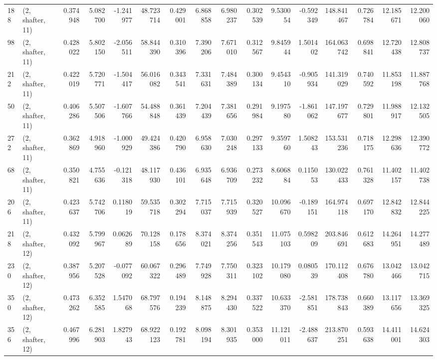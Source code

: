 \begin{tabular}{llrrrrrrrrrrrrrr}
188 &  (2, shafter, 11) &   0.374948 &   5.082700 &  -1.241977 &    48.723714 &   0.429001 &   6.868858 &   6.980237 &  0.302539 &   9.530054 &  -0.592349 &   148.841467 &  0.726784 &  12.185671 &  12.200060 \\
98  &  (2, shafter, 11) &   0.428022 &   5.802150 &  -2.056511 &    58.844390 &   0.310396 &   7.390206 &   7.671010 &  0.312567 &   9.845944 &   1.501402 &   164.063742 &  0.698841 &  12.720438 &  12.808737 \\
212 &  (2, shafter, 11) &   0.422019 &   5.720771 &  -1.504417 &    56.016082 &   0.343541 &   7.331631 &   7.484389 &  0.300134 &   9.454310 &  -0.905934 &   141.319029 &  0.740592 &  11.853198 &  11.887768 \\
50  &  (2, shafter, 11) &   0.406286 &   5.507506 &  -1.607766 &    54.488848 &   0.361439 &   7.204439 &   7.381656 &  0.291984 &   9.197580 &  -1.861062 &   147.197677 &  0.729801 &  11.988917 &  12.132505 \\
272 &  (2, shafter, 11) &   0.362869 &   4.918960 &  -1.000929 &    49.424386 &   0.420790 &   6.958630 &   7.030248 &  0.297133 &   9.359760 &   1.508243 &   153.531236 &  0.718175 &  12.298636 &  12.390772 \\
68  &  (2, shafter, 11) &   0.350821 &   4.755636 &  -0.121318 &    48.117930 &   0.436101 &   6.935648 &   6.936709 &  0.273232 &   8.606884 &   0.115053 &   130.022433 &  0.761328 &  11.402157 &  11.402738 \\
206 &  (2, shafter, 11) &   0.423637 &   5.742706 &   0.118019 &    59.535718 &   0.302294 &   7.715037 &   7.715939 &  0.320527 &  10.096670 &  -0.189151 &   164.974118 &  0.697170 &  12.842832 &  12.844225 \\
218 &  (2, shafter, 12) &   0.432092 &   5.799967 &   0.062689 &    70.128158 &   0.178656 &   8.374021 &   8.374256 &  0.351543 &  11.075103 &   0.598209 &   203.846691 &  0.612683 &  14.264951 &  14.277489 \\
230 &  (2, shafter, 12) &   0.387956 &   5.207528 &  -0.077092 &    60.067322 &   0.296489 &   7.749928 &   7.750311 &  0.323102 &  10.179080 &   0.080539 &   170.112408 &  0.676780 &  13.042466 &  13.042715 \\
350 &  (2, shafter, 12) &   0.473262 &   6.352585 &   1.547068 &    68.797576 &   0.194239 &   8.148875 &   8.294430 &  0.337522 &  10.633370 &  -2.581851 &   178.738843 &  0.660389 &  13.117656 &  13.369325 \\
356 &  (2, shafter, 12) &   0.467996 &   6.281903 &   1.827943 &    68.922123 &   0.192781 &   8.098194 &   8.301935 &  0.353000 &  11.121011 &  -2.488637 &   213.870251 &  0.593638 &  14.411001 &  14.624303 \\

\end{tabular}
